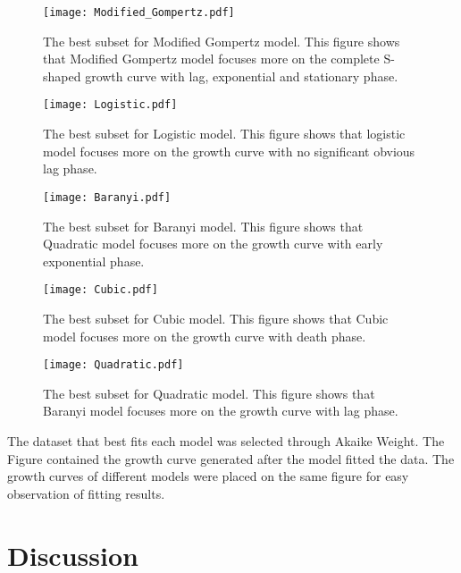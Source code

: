 \documentclass{article}
\begin{document}
\begin{figure}[H]
    \centering
    \texttt{[image: Modified\_Gompertz.pdf]}
    \caption{The best subset for Modified Gompertz model. This figure shows that Modified Gompertz model focuses more on the complete S-shaped growth curve with lag, exponential and stationary phase.}
    \label{fig:Figure.1}
\end{figure}


\begin{figure}[H]
    \centering
    \texttt{[image: Logistic.pdf]}
    \caption{The best subset for Logistic model. This figure shows that logistic model focuses more on the growth curve with no significant obvious lag phase.}
    \label{fig:Figure.2}
\end{figure}


\begin{figure}[H]
    \centering
    \texttt{[image: Baranyi.pdf]}
    \caption{The best subset for Baranyi model. This figure shows that Quadratic model focuses more on the growth curve with early exponential phase.}
    \label{fig:Figure.3}
\end{figure}




\begin{figure}[H]
    \centering
    \texttt{[image: Cubic.pdf]}
    \caption{The best subset for Cubic model. This figure shows that Cubic model focuses more on the growth curve with death phase.}
    \label{fig:Figure.4}
\end{figure}


\begin{figure}[H]
    \centering
    \texttt{[image: Quadratic.pdf]}
    \caption{The best subset for Quadratic model. This figure shows that Baranyi model focuses more on the growth curve with lag phase.}
    \label{fig:Figure.5}
\end{figure}


The dataset that best fits each model was selected through Akaike Weight. The Figure contained the growth curve generated after the model fitted the data. The growth curves of different models were placed on the same figure for easy observation of fitting results.

\newpage


\section{Discussion}
\end{document}
